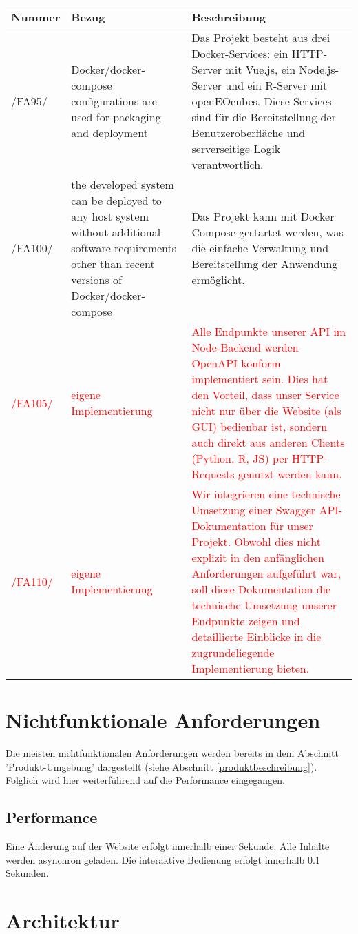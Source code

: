 \documentclass[a4paper,12pt]{article}
\newcommand{\addrow}[3]{#1 &#2 &#3 \\ [0.2cm]}
\newcommand{\addheading}[3]{#1 &#2 &#3\\ \hline }
\newcommand{\tabularhead}{\begin{tabular}{l p{5cm} p{8cm}}
\hline
}
\newenvironment{usecase}{\tabularhead}
{\hline\end{tabular}}
\begin{document}
\begin{usecase}

  \addheading{Nummer}{Bezug}{Beschreibung} 
  \addrow{/FA95/}{Docker/docker-compose configurations are used for packaging and deployment}{Das Projekt besteht aus drei Docker-Services: ein HTTP-Server mit Vue.js, ein Node.js-Server und ein R-Server mit openEOcubes. Diese Services sind für die Bereitstellung der Benutzeroberfläche und  serverseitige Logik verantwortlich.}
  \addrow{/FA100/}{the developed system can be deployed to any host system without additional
software requirements other than recent versions of Docker/docker-compose}{Das Projekt kann mit Docker Compose gestartet werden, was die einfache Verwaltung und Bereitstellung der Anwendung ermöglicht.}
\textcolor{red}{}
\addrow{\textcolor{red}{/FA105/}}{\textcolor{red}{eigene Implementierung}}{\textcolor{red}{Alle Endpunkte unserer API im Node-Backend werden OpenAPI konform implementiert sein. Dies hat den Vorteil, dass unser Service nicht nur über die Website (als GUI) bedienbar ist,
sondern auch direkt aus anderen Clients (Python, R, JS) per HTTP-Requests genutzt werden kann.}}
\addrow{\textcolor{red}{/FA110/}}{\textcolor{red}{eigene Implementierung}}{\textcolor{red}{Wir integrieren eine technische Umsetzung einer Swagger API-Dokumentation für unser Projekt.
Obwohl dies nicht explizit in den anfänglichen Anforderungen aufgeführt war,
soll diese Dokumentation die technische Umsetzung unserer Endpunkte zeigen und detaillierte Einblicke in die zugrundeliegende Implementierung bieten.}}


\end{usecase}

\section{Nichtfunktionale Anforderungen}
Die meisten nichtfunktionalen Anforderungen werden bereits in dem Abschnitt 'Produkt-Umgebung' dargestellt (siehe Abschnitt \ref{produktbeschreibung}). Folglich wird hier weiterführend auf die Performance eingegangen.
\subsection{Performance}
Eine Änderung auf der Website erfolgt innerhalb einer Sekunde. Alle Inhalte werden asynchron geladen. Die interaktive Bedienung erfolgt innerhalb 0.1 Sekunden.


\section{Architektur}
\end{document}
